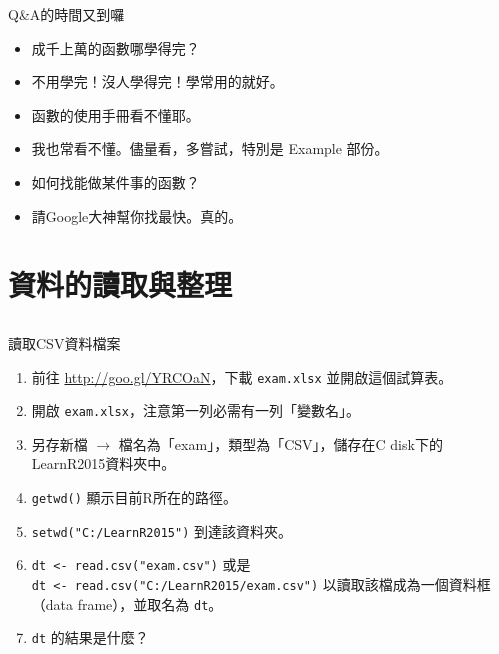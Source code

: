 \documentclass[12pt]{beamer}
\begin{document}
\begin{frame}[fragile]{Q\&A的時間又到囉}
\begin{itemize}
\item[Q] 成千上萬的函數哪學得完？
\item[A] 不用學完！沒人學得完！學常用的就好。
\end{itemize}
\begin{itemize}
\item[Q] 函數的使用手冊看不懂耶。
\item[A] 我也常看不懂。儘量看，多嘗試，特別是 Example 部份。
\end{itemize}
\begin{itemize}
\item[Q] 如何找能做某件事的函數？
\item[A] 請Google大神幫你找最快。真的。
\end{itemize}
\end{frame}


\section{資料的讀取與整理}\subsection{}

\begin{frame}[fragile]{讀取CSV資料檔案}
\begin{enumerate}
\item 前往 \url{http://goo.gl/YRCOaN}，下載 \verb+exam.xlsx+ 並開啟這個試算表。
\item 開啟 \verb+exam.xlsx+，注意第一列必需有一列「變數名」。
\item 另存新檔 $\rightarrow$ 檔名為「exam」，類型為「CSV」，儲存在C disk下的LearnR2015資料夾中。
\item \verb+getwd()+ 顯示目前R所在的路徑。
\item \verb+setwd("C:/LearnR2015")+ 到達該資料夾。
\item \verb+dt <- read.csv("exam.csv")+ 或是 \\
      \verb+dt <- read.csv("C:/LearnR2015/exam.csv")+ 以讀取該檔成為一個資料框（data frame），並取名為 \verb+dt+。\\
\item \verb+dt+ 的結果是什麼？
\end{enumerate}
\end{frame}
\end{document}
